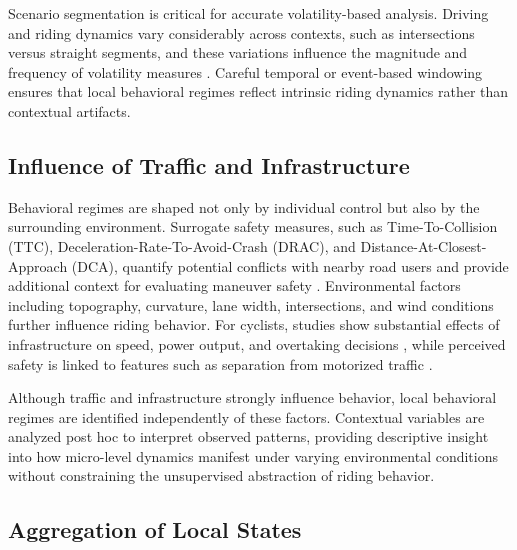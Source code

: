 Scenario segmentation is critical for accurate volatility-based analysis. Driving and riding dynamics vary considerably across contexts, such as intersections versus straight segments, and these variations influence the magnitude and frequency of volatility measures \cite{mohammadnazar_classifying_2021, li_volatility-based_2025}. Careful temporal or event-based windowing ensures that local behavioral regimes reflect intrinsic riding dynamics rather than contextual artifacts.

\subsection*{Influence of Traffic and Infrastructure}

Behavioral regimes are shaped not only by individual control but also by the surrounding environment. Surrogate safety measures, such as Time-To-Collision (TTC), Deceleration-Rate-To-Avoid-Crash (DRAC), and Distance-At-Closest-Approach (DCA), quantify potential conflicts with nearby road users and provide additional context for evaluating maneuver safety \cite{wang_review_2021}. Environmental factors including topography, curvature, lane width, intersections, and wind conditions further influence riding behavior. For cyclists, studies show substantial effects of infrastructure on speed, power output, and overtaking decisions \cite{belikhov_exploring_2025, wang_investigating_2022}, while perceived safety is linked to features such as separation from motorized traffic \cite{gossling_subjectively_2022, von_stulpnagel_how_2022}.

Although traffic and infrastructure strongly influence behavior, local behavioral regimes are identified independently of these factors. Contextual variables are analyzed post hoc to interpret observed patterns, providing descriptive insight into how micro-level dynamics manifest under varying environmental conditions without constraining the unsupervised abstraction of riding behavior.

\subsection*{Aggregation of Local States}

